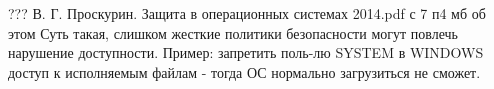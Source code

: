 ??? В. Г. Проскурин. Защита в операционных системах 2014.pdf с 7 п4 мб об этом
Суть такая, слишком жесткие политики безопасности могут повлечь нарушение доступности. Пример: запретить поль-лю SYSTEM в WINDOWS доступ к исполняемым файлам - тогда ОС нормально загрузиться не сможет.
%
%
%


